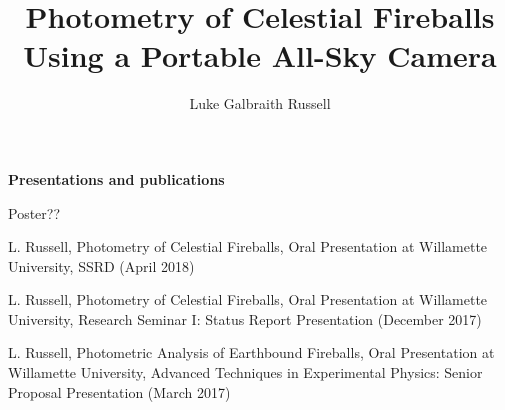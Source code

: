 \documentclass[12pt]{report}
\begin{document}
\title{Photometry of Celestial Fireballs Using a Portable All-Sky Camera}
\author{Luke Galbraith Russell}

\maketitle


\newpage

\begin{center}
\textbf{Presentations and publications}

Poster??
\bigskip

L. Russell, Photometry of Celestial Fireballs, Oral Presentation at Willamette University, SSRD (April 2018)
\bigskip

L. Russell, Photometry of Celestial Fireballs, Oral Presentation at Willamette University, Research Seminar I: Status Report Presentation (December 2017)
\bigskip

L. Russell, Photometric Analysis of Earthbound Fireballs, Oral Presentation at Willamette University, Advanced Techniques in Experimental Physics: Senior Proposal Presentation (March 2017)
\bigskip
\end{center}



\begin{acknowledgments}

\end{acknowledgments}

\begin{abstract}

\end{abstract}

\tableofcontents
\listoftables
\listoffigures








%



\appendix
%
\end{document}
